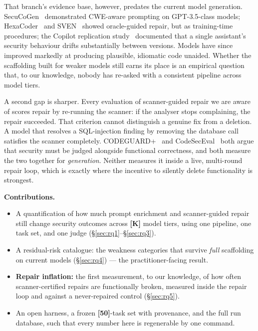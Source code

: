 \documentclass[10pt,conference]{article}
\newcommand{\PLACEHOLDER}[1]{{\color{placeholderred}\textbf{[#1]}}}
\begin{document}
That branch's evidence base, however, predates the current model generation.
SecuCoGen~\cite{wang2024secucogen} demonstrated CWE-aware prompting on
GPT-3.5-class models; HexaCoder~\cite{hajipour2024hexacoder} and
SVEN~\cite{he2023sven} showed oracle-guided repair, but as training-time
procedures; the Copilot replication study~\cite{majdinasab2023replication}
documented that a single assistant's security behaviour drifts substantially
between versions. Models have since improved markedly at producing plausible,
idiomatic code unaided. Whether the scaffolding built for weaker models still
earns its place is an empirical question that, to our knowledge, nobody has
re-asked with a consistent pipeline across model tiers.

A second gap is sharper. Every evaluation of scanner-guided repair we are aware
of scores repair by re-running the scanner: if the analyser stops complaining,
the repair succeeded. That criterion cannot distinguish a genuine fix from a
deletion. A model that resolves a SQL-injection finding by removing the database
call satisfies the scanner completely. CODEGUARD+~\cite{fu2024constrained} and
CodeSecEval~\cite{wang2024codeseceval} both argue that security must be judged
alongside functional correctness, and both measure the two together for
\emph{generation}. Neither measures it inside a live, multi-round repair loop,
which is exactly where the incentive to silently delete functionality is
strongest.

\noindent\textbf{Contributions.}
\begin{itemize}\itemsep2pt
  \item A quantification of how much prompt enrichment and scanner-guided repair
        still change security outcomes across \PLACEHOLDER{K} model tiers, using
        one pipeline, one task set, and one judge (\S\ref{sec:rq1}--\S\ref{sec:rq3}).
  \item A residual-risk catalogue: the weakness categories that survive
        \emph{full} scaffolding on current models (\S\ref{sec:rq4}) --- the
        practitioner-facing result.
  \item \textbf{Repair inflation:} the first measurement, to our knowledge, of how
        often scanner-certified repairs are functionally broken, measured inside
        the repair loop and against a never-repaired control
        (\S\ref{sec:rq5}).
  \item An open harness, a frozen \PLACEHOLDER{50}-task set with provenance, and
        the full run database, such that every number here is regenerable by one
        command.
\end{itemize}
\end{document}
